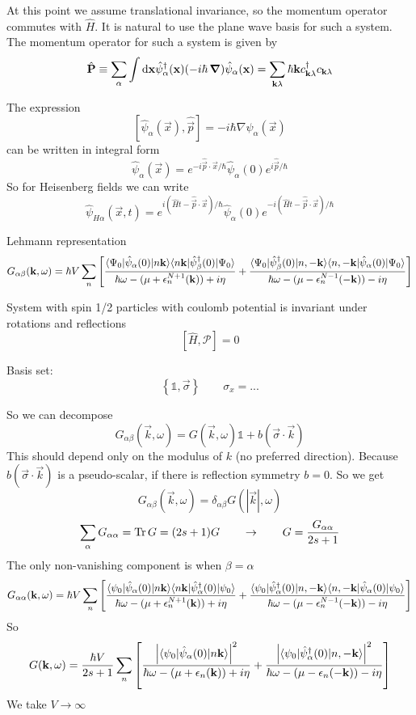 At this point we assume translational invariance, so the momentum operator commutes with $\hat{H}$. It is natural to use the plane wave basis for such a system. The momentum operator for such a system is given by
\[ \hat{\bm{\mathrm{P}}} \equiv \sum_\alpha \int \operatorname{d \!}{\bm{\mathrm{x}}}\hat{\psi}^\dagger_\alpha(\bm{\mathrm{x}})(-i\hbar \operatorname{\bm{\mathrm{\nabla}}})\hat{\psi}_\alpha(\bm{\mathrm{x}}) = \sum_{\bm{\mathrm{k}}\lambda}\hbar \bm{\mathrm{k}}c^\dagger_{\bm{\mathrm{k}}\lambda}c_{\bm{\mathrm{k}}\lambda} \]

The expression
\[ \left[\hat{\psi}_\alpha(\vec{x}), \hat{\vec{p}}\right] = -i\hbar\nabla\psi_\alpha(\vec{x}) \]
can be written in integral form
\[ \hat{\psi}_\alpha(\vec{x}) = e^{-i\hat{\vec{p}}\cdot\vec{x}/\hbar}\hat{\psi}_\alpha(0)e^{i\hat{\vec{p}}/\hbar} \]
So for Heisenberg fields we can write
\[ \hat{\psi}_{H\alpha}(\vec{x},t) = e^{i(\hat{H}t - \hat{\vec{p}}\cdot\vec{x})/\hbar}\hat{\psi}_\alpha(0)e^{-i(\hat{H}t- \hat{\vec{p}}\cdot \vec{x})/\hbar} \]

Lehmann representation
\[ G_{\alpha\beta}(\vec{k}, \omega) = \hbar V \sum_{n} \left[\frac{\braket[\hat{\psi}_\alpha(0)]{\Psi_0}{n\vec{k}}\braket[\hat{\psi}^\dagger_\beta(0)]{n\vec{k}}{\Psi_0}}{\hbar\omega - (\mu + \epsilon_n^{N+1}(\vec{k}))+i\eta} + \frac{\braket[\hat{\psi}_\beta^\dagger(0)]{\Psi_0}{n,-\vec{k}}\braket[\hat{\psi}_\alpha(0)]{n,-\vec{k}}{\Psi_0}}{\hbar\omega - (\mu - \epsilon_n^{N-1}(-\vec{k}))-i\eta} \right] \]

System with spin 1/2 particles with coulomb potential is invariant under rotations and reflections
\[ \left[\hat{H}, \mathcal{P}\right] = 0 \]

Basis set:
\[ \left\{\mathbb{1}, \vec{\sigma}\right\} \qquad \sigma_x = ... \]

So we can decompose
\[ G_{\alpha\beta}(\vec{k},\omega) = G(\vec{k},\omega)\mathbb{1} + b(\vec{\sigma}\cdot\vec{k}) \]
This should depend only on the modulus of $k$ (no preferred direction). Because $b(\vec{\sigma}\cdot\vec{k})$ is a pseudo-scalar, if there is reflection symmetry $b = 0$.
So we get
\[G_{\alpha\beta}(\vec{k},\omega) = \delta_{\alpha\beta}G(|\vec{k}|, \omega)\]
\[ \sum_\alpha G_{\alpha\alpha} = \operatorname{Tr} G = (2s+1)G \qquad \to \qquad G = \frac{G_{\alpha\alpha}}{2s+1} \]
The only non-vanishing component is when $\beta=\alpha$
\[ G_{\alpha\alpha}(\vec{k}, \omega) = \hbar V \sum_{n} \left[\frac{\braket[\hat{\psi}_\alpha(0)]{\psi_0}{n\vec{k}}\braket[\hat{\psi}^\dagger_\alpha(0)]{n\vec{k}}{\psi_0}}{\hbar\omega - (\mu + \epsilon_n^{N+1}(\vec{k}))+i\eta} + \frac{\braket[\hat{\psi}_\alpha^\dagger(0)]{\psi_0}{n,-\vec{k}}\braket[\hat{\psi}_\alpha(0)]{n,-\vec{k}}{\psi_0}}{\hbar\omega - (\mu - \epsilon_n^{N-1}(-\vec{k}))-i\eta} \right] \]
So
\[ G(\vec{k},\omega) = \frac{\hbar V}{2s+1}\sum_n \left[\frac{\left|\braket[\hat{\psi}_\alpha(0)]{\psi_0}{n\vec{k}}\right|^2}{\hbar\omega- (\mu+\epsilon_n(\vec{k}))+i\eta} + \frac{\left|\braket[\hat{\psi}_\alpha^\dagger(0)]{\psi_0}{n,-\vec{k}}\right|^2}{\hbar\omega- (\mu-\epsilon_n(-\vec{k}))-i\eta}\right] \]
We take $V\to\infty$


